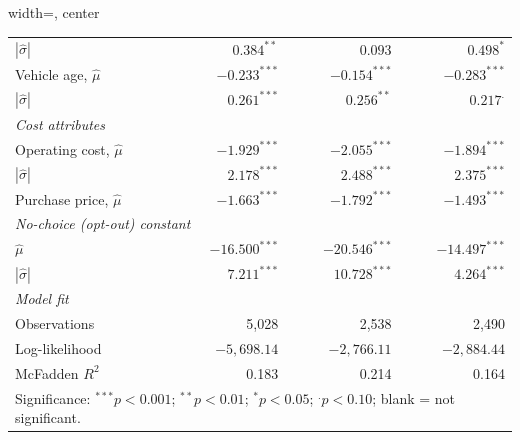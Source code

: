 \documentclass[a4paper,fleqn]{cas-sc}   %
\begin{document}
\begin{table}[pos=H]
\begin{adjustbox}{width=\textwidth, center}
{\begin{tabular}{lrrr}
\quad\quad $|\hat{\sigma}|$          & $0.384^{**}$    & $0.093$         & $0.498^{*}$    \\[3pt]
\quad Vehicle age, $\hat{\mu}$       & $-0.233^{***}$  & $-0.154^{***}$  & $-0.283^{***}$ \\
\quad\quad $|\hat{\sigma}|$          & $0.261^{***}$   & $0.256^{**}$    & $0.217^{.}$    \\[3pt]
\multicolumn{4}{l}{\textit{Cost attributes}} \\[2pt]
\quad Operating cost, $\hat{\mu}$    & $-1.929^{***}$  & $-2.055^{***}$  & $-1.894^{***}$ \\
\quad\quad $|\hat{\sigma}|$          & $2.178^{***}$   & $2.488^{***}$   & $2.375^{***}$  \\[3pt]
\quad Purchase price, $\hat{\mu}$    & $-1.663^{***}$  & $-1.792^{***}$  & $-1.493^{***}$ \\[3pt]
\multicolumn{4}{l}{\textit{No-choice (opt-out) constant}} \\[2pt]
\quad $\hat{\mu}$                    & $-16.500^{***}$ & $-20.546^{***}$ & $-14.497^{***}$\\
\quad\quad $|\hat{\sigma}|$          & $7.211^{***}$   & $10.728^{***}$  & $4.264^{***}$  \\
\midrule
\multicolumn{4}{l}{\textit{Model fit}} \\[2pt]
\quad Observations                   & 5,028           & 2,538           & 2,490          \\
\quad Log-likelihood                 & $-5{,}698.14$   & $-2{,}766.11$   & $-2{,}884.44$  \\
\quad McFadden $R^{2}$               & 0.183           & 0.214           & 0.164          \\
\bottomrule
\multicolumn{4}{p{\dimexpr\linewidth-2\tabcolsep\relax}}{\footnotesize
  Significance: $^{***}p<0.001$; $^{**}p<0.01$; $^{*}p<0.05$; $^{.}p<0.10$; blank = not significant.} \\
\end{tabular}}
\end{adjustbox}
\end{table}
\end{document}
